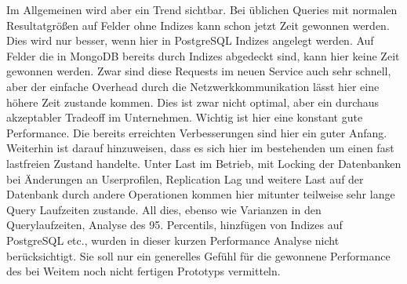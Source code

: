 Im Allgemeinen wird aber ein Trend sichtbar. Bei üblichen Queries mit normalen Resultatgrößen auf Felder ohne Indizes kann schon jetzt Zeit gewonnen werden. Dies wird nur besser, wenn hier in PostgreSQL Indizes angelegt werden. 
Auf Felder die in MongoDB bereits durch Indizes abgedeckt sind, kann hier keine Zeit gewonnen werden. Zwar sind diese Requests im neuen Service auch sehr schnell, aber der einfache Overhead durch die Netzwerkkommunikation lässt hier eine höhere Zeit zustande kommen.
Dies ist zwar nicht optimal, aber ein durchaus akzeptabler Tradeoff im Unternehmen. Wichtig ist hier eine konstant gute Performance. Die bereits erreichten Verbesserungen sind hier ein guter Anfang.
Weiterhin ist darauf hinzuweisen, dass es sich hier im bestehenden um einen fast lastfreien Zustand handelte. Unter Last im Betrieb, mit Locking der Datenbanken bei Änderungen an Userprofilen, Replication Lag und weitere Last auf der Datenbank durch andere Operationen kommen hier mitunter teilweise sehr lange Query Laufzeiten zustande. 
All dies, ebenso wie Varianzen in den Querylaufzeiten, Analyse des 95. Percentils, hinzfügen von Indizes auf PostgreSQL etc., wurden in dieser kurzen Performance Analyse nicht berücksichtigt. Sie soll nur ein generelles Gefühl für die gewonnene Performance des bei Weitem noch nicht fertigen Prototyps vermitteln.